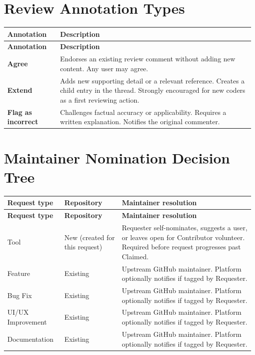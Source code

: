 \documentclass[12pt,a4paper]{article}
\begin{document}
\section{Review Annotation Types}
\begin{longtable}{L{3.2cm} L{10.1cm}}
  \color{white}\bfseries Annotation & \color{white}\bfseries Description \\
  \endfirsthead
  \color{white}\bfseries Annotation & \color{white}\bfseries Description \\
  \endhead\hline
  \textbf{Agree}             & Endorses an existing review comment without adding new content. Any user may agree. \\
  \textbf{Extend}            & Adds new supporting detail or a relevant reference. Creates a child entry in the thread. Strongly encouraged for new coders as a first reviewing action. \\
  \textbf{Flag as incorrect} & Challenges factual accuracy or applicability. Requires a written explanation. Notifies the original commenter. \\
  \hline
\end{longtable}

\section{Maintainer Nomination Decision Tree}

\begin{longtable}{L{3.5cm} L{3.5cm} L{6.3cm}}
  \color{white}\bfseries Request type & \color{white}\bfseries Repository & \color{white}\bfseries Maintainer resolution \\
  \endfirsthead
  \color{white}\bfseries Request type & \color{white}\bfseries Repository & \color{white}\bfseries Maintainer resolution \\
  \endhead\hline
  Tool           & New (created for this request) & Requester self-nominates, suggests a user, or leaves open for Contributor volunteer. Required before request progresses past Claimed. \\
  Feature        & Existing & Upstream GitHub maintainer. Platform optionally notifies if tagged by Requester. \\
  Bug Fix        & Existing & Upstream GitHub maintainer. Platform optionally notifies if tagged by Requester. \\
  UI/UX Improvement & Existing & Upstream GitHub maintainer. Platform optionally notifies if tagged by Requester. \\
  Documentation  & Existing & Upstream GitHub maintainer. Platform optionally notifies if tagged by Requester. \\
  \hline
\end{longtable}
\end{document}
